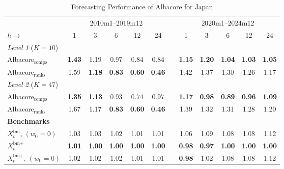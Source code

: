 \begin{table}[ht]
\centering
\caption{Forecasting Performance of Albacore for Japan}
\label{tab:japan}
\begin{threeparttable}
\begin{tabular*}{\textwidth}{@{\extracolsep{\fill}}lccccc c ccccc@{}}
\toprule
 & \multicolumn{5}{c}{2010m1--2019m12} & \phantom{aa} & \multicolumn{5}{c}{2020m1--2024m12} \\
\cmidrule{2-6} \cmidrule{8-12}
$h \rightarrow$ & 1 & 3 & 6 & 12 & 24 & & 1 & 3 & 6 & 12 & 24 \\
\midrule
\multicolumn{12}{l}{\textit{Level 1} ($K = 10$)} \\
\quad Albacore$_{\text{comps}}$ & \textbf{1.43} & 1.19 & 0.97 & 0.84 & 0.84 & & \textbf{1.15} & \textbf{1.20} & \textbf{1.04} & \textbf{1.03} & \textbf{1.05} \\
\quad Albacore$_{\text{ranks}}$ & 1.59 & \textbf{1.18} & \textcolor{green!55!black}{\textbf{0.83}} & \textcolor{green!55!black}{\textbf{0.60}} & \textcolor{green!55!black}{\textbf{0.46}} & & 1.42 & 1.37 & 1.30 & 1.26 & 1.17 \\
\midrule
\multicolumn{12}{l}{\textit{Level 2} ($K = 47$)} \\
\quad Albacore$_{\text{comps}}$ & \textbf{1.35} & \textbf{1.13} & 0.93 & 0.74 & 0.97 & & \textbf{1.17} & \textbf{0.98} & \textcolor{green!55!black}{\textbf{0.89}} & \textcolor{green!55!black}{\textbf{0.96}} & \textbf{1.09} \\
\quad Albacore$_{\text{ranks}}$ & 1.67 & 1.17 & \textcolor{green!55!black}{\textbf{0.83}} & \textcolor{green!55!black}{\textbf{0.60}} & \textcolor{green!55!black}{\textbf{0.46}} & & 1.39 & 1.32 & 1.31 & 1.28 & 1.20 \\
\midrule
\multicolumn{12}{l}{\textbf{Benchmarks}} \\
$X^{\text{bm}}_t$, $(w_0 = 0)$ & 1.03 & 1.03 & 1.02 & 1.01 & 1.01 & & 1.06 & 1.09 & 1.08 & 1.08 & 1.12 \\
$X^{\text{bm}+}_t$ & \textcolor{green!55!black}{\textbf{1.01}} & \textcolor{green!55!black}{\textbf{1.00}} & \textbf{1.00} & \textbf{1.00} & \textbf{1.00} & & \textcolor{green!55!black}{\textbf{0.98}} & \textcolor{green!55!black}{\textbf{0.97}} & \textbf{1.00} & \textbf{1.00} & \textcolor{green!55!black}{\textbf{1.00}} \\
$X^{\text{bm}+}_t$, $(w_0 = 0)$ & 1.02 & 1.02 & 1.02 & 1.01 & 1.01 & & \textcolor{green!55!black}{\textbf{0.98}} & 1.02 & 1.08 & 1.08 & 1.12 \\
\bottomrule
\end{tabular*}

\end{threeparttable}
\end{table}
